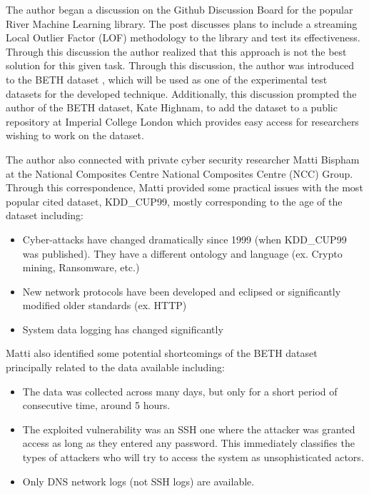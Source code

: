 The author began a discussion on the Github Discussion Board \cite{RiverGithub2022} for the popular River \cite{2020river} Machine Learning library. The post discusses plans to include a streaming Local Outlier Factor (LOF) methodology to the library and test its effectiveness. Through this discussion the author realized that this approach is not the best solution for this given task. Through this discussion, the author was introduced to the BETH dataset \cite{beth-dataset}, which will be used as one of the experimental test datasets for the developed technique. Additionally, this discussion prompted the author of the BETH dataset, Kate Highnam, to add the dataset to a public repository at Imperial College London which provides easy access for researchers wishing to work on the dataset.

The author also connected with private cyber security researcher Matti Bispham \cite{Bispham-email:private} at the National Composites Centre National Composites Centre (NCC) Group. Through this correspondence, Matti provided some practical issues with the most popular cited dataset, KDD\_CUP99, mostly corresponding to the age of the dataset including:

\begin{itemize}[leftmargin=2cm]
    \item Cyber-attacks have changed dramatically since 1999 (when KDD\_CUP99 was published). They have a different ontology and language (ex. Crypto mining, Ransomware, etc.)
    \item New network protocols have been developed and eclipsed or significantly modified older standards (ex. HTTP)
    \item System data logging has changed significantly
\end{itemize}

Matti also identified some potential shortcomings of the BETH dataset principally related to the data available including:

\begin{itemize}[leftmargin=2cm]
    \item The data was collected across many days, but only for a short period of consecutive time, around 5 hours.
    \item The exploited vulnerability was an SSH one where the attacker was granted access as long as they entered any password. This immediately classifies the types of attackers who will try to access the system as unsophisticated actors.
    \item Only DNS network logs (not SSH logs) are available.
\end{itemize}

